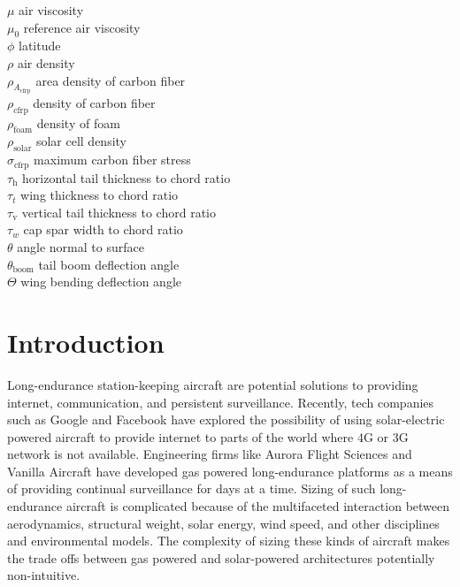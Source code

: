 \begin{multicols}{2}
\begin{tabbing}
$\mu$ \> air viscosity \\ %
$\mu_0$ \> reference air viscosity \\ %
$\phi$ \> latitude \\
$\rho$ \> air density \\ %
$\rho_{A_{\text{cfrp}}}$ \> area density of carbon fiber \\ %
$\rho_{\text{cfrp}}$ \> density of carbon fiber \\ %
$\rho_{\text{foam}}$ \> density of foam \\ %
$\rho_{\text{solar}}$ \> solar cell density \\ %
$\sigma_{\text{cfrp}}$ \> maximum carbon fiber stress \\ %
$\tau_{\text{h}}$ \> horizontal tail thickness to chord ratio \\
$\tau_t$ \> wing thickness to chord ratio \\
$\tau_{\text{v}}$ \> vertical tail thickness to chord ratio \\
$\tau_w$ \> cap spar width to chord ratio \\
$\theta$ \> angle normal to surface \\
$\theta_{\text{boom}}$ \> tail boom deflection angle \\
$\Theta$ \> wing bending deflection angle 
 \end{tabbing}

\end{multicols}

\section{Introduction}

Long-endurance station-keeping aircraft are potential solutions to providing internet, communication, and persistent surveillance. 
Recently, tech companies such as Google\cite{googletitan} and Facebook\cite{aquila} have explored the possibility of using solar-electric powered aircraft to provide internet to parts of the world where 4G or 3G network is not available. 
Engineering firms like Aurora Flight Sciences\cite{orion} and Vanilla Aircraft\cite{vanilla} have developed gas powered long-endurance platforms as a means of providing continual surveillance for days at a time.  
Sizing of such long-endurance aircraft is complicated because of the multifaceted interaction between aerodynamics, structural weight, solar energy, wind speed, and other disciplines and environmental models.
The complexity of sizing these kinds of aircraft makes the trade offs between gas powered and solar-powered architectures potentially non-intuitive. 

